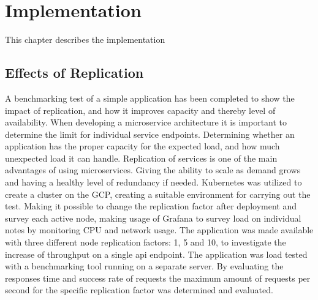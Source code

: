 \chapter{Implementation}
\label{ch:implementation}
This chapter describes the implementation



\section{Effects of Replication}
\label{sec:Effects_of_Replication}

A benchmarking test of a simple application has been completed to show the impact of replication, and how it improves capacity and thereby level of availability. When developing a microservice architecture it is important to determine the limit for individual service endpoints. Determining whether an application has the proper capacity for the expected load, and how much unexpected load it can handle. Replication of services is one of the main advantages of using microservices. Giving the ability to scale as demand grows and having a healthy level of redundancy if needed. 
Kubernetes was utilized to create a cluster on the GCP, creating a suitable environment for carrying out the test. Making it possible to change the replication factor after deployment and survey each active node, making usage of Grafana to survey load on individual notes by monitoring CPU and network usage. The application was made available with three different node replication factors: 1,  5 and 10, to investigate the increase of throughput on a single api endpoint. 
The application was load tested with a benchmarking tool running on a separate server. By evaluating the responses time and success rate of requests the maximum amount of requests per second for the specific replication factor was determined and evaluated.


